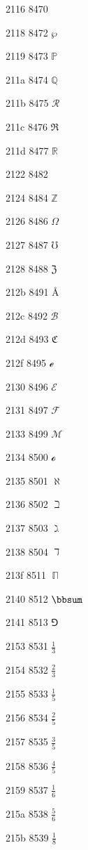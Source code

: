 \documentclass[11pt]{article}
\begin{document}
2116 8470 \textnumero

2118 8472 \ensuremath{\wp}

2119 8473 \ensuremath{\mathbb{P}}

211a 8474 \ensuremath{\mathbb{Q}}

211b 8475 \ensuremath{\mathscr{R}}

211c 8476 \ensuremath{\Re}

211d 8477 \ensuremath{\mathbb{R}}

2122 8482 \texttrademark

2124 8484 \ensuremath{\mathbb{Z}}

2126 8486 \ensuremath{\Omega}

2127 8487 \ensuremath{\mho}

2128 8488 \ensuremath{\mathfrak{Z}}

212b 8491 \AA

212c 8492 \ensuremath{\mathscr{B}}

212d 8493 \ensuremath{\mathfrak{C}}

212f 8495 \ensuremath{\mathscr{e}}

2130 8496 \ensuremath{\mathscr{E}}

2131 8497 \ensuremath{\mathscr{F}}

2133 8499 \ensuremath{\mathscr{M}}

2134 8500 \ensuremath{\mathscr{o}}

2135 8501 \ensuremath{\aleph}

2136 8502 \ensuremath{\beth}

2137 8503 \ensuremath{\gimel}

2138 8504 \ensuremath{\daleth}

213f 8511 \ensuremath{\BbbPi}

2140 8512 \ensuremath{\bbsum}

2141 8513 \ensuremath{\Game}

2153 8531 \ensuremath{\frac{1}{3}}

2154 8532 \ensuremath{\frac{2}{3}}

2155 8533 \ensuremath{\frac{1}{5}}

2156 8534 \ensuremath{\frac{2}{5}}

2157 8535 \ensuremath{\frac{3}{5}}

2158 8536 \ensuremath{\frac{4}{5}}

2159 8537 \ensuremath{\frac{1}{6}}

215a 8538 \ensuremath{\frac{5}{6}}

215b 8539 \ensuremath{\frac{1}{8}}
\end{document}

